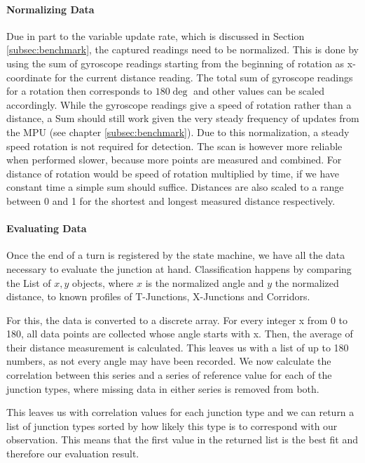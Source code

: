 \paragraph{Normalizing Data}
Due in part to the variable update rate, which is discussed in Section \ref{subsec:benchmark}, the captured readings need to be normalized.
This is done by using the sum of gyroscope readings starting from the beginning of rotation as x-coordinate for the current distance reading.
The total sum of gyroscope readings for a rotation then corresponds to $180\deg$ and other values can be scaled accordingly.
While the gyroscope readings give a speed of rotation rather than a distance, a Sum should still work given the very steady frequency of updates from the MPU (see chapter \ref{subsec:benchmark}).
Due to this normalization, a steady speed rotation is not required for detection. The scan is however more reliable when performed slower, because more points are measured and combined.
For distance of rotation would be speed of rotation multiplied by time, if we have constant time a simple sum should suffice.
Distances are also scaled to a range between 0 and 1 for the shortest and longest measured distance respectively.


\paragraph{Evaluating Data}
Once the end of a turn is registered by the state machine, we have all the data necessary to evaluate the junction at hand.
Classification happens by comparing the List of ${x,y}$ objects, where $x$ is the normalized angle and $y$ the normalized distance, to known profiles of T-Junctions, X-Junctions and Corridors.

For this, the data is converted to a discrete array. For every integer x from 0 to 180, all data points are collected whose angle starts with x. Then, the average of their distance measurement is calculated. This leaves us with a list of up to 180 numbers, as not every angle may have been recorded. We now calculate the correlation between this series and a series of reference value for each of the junction types, where missing data in either series is removed from both.

This leaves us with correlation values for each junction type and we can return a list of junction types sorted by how likely this type is to correspond with our observation. This means that the first value in the returned list is the best fit and therefore our evaluation result.

